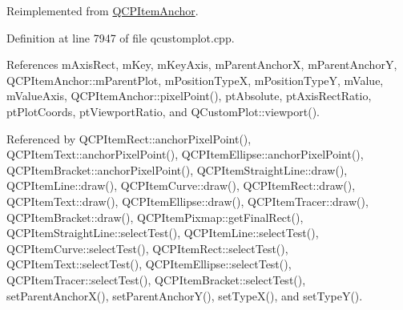Reimplemented from \hyperlink{class_q_c_p_item_anchor_ae92def8f9297c5d73f5806c586517bb3}{Q\+C\+P\+Item\+Anchor}.



Definition at line 7947 of file qcustomplot.\+cpp.



References m\+Axis\+Rect, m\+Key, m\+Key\+Axis, m\+Parent\+Anchor\+X, m\+Parent\+Anchor\+Y, Q\+C\+P\+Item\+Anchor\+::m\+Parent\+Plot, m\+Position\+Type\+X, m\+Position\+Type\+Y, m\+Value, m\+Value\+Axis, Q\+C\+P\+Item\+Anchor\+::pixel\+Point(), pt\+Absolute, pt\+Axis\+Rect\+Ratio, pt\+Plot\+Coords, pt\+Viewport\+Ratio, and Q\+Custom\+Plot\+::viewport().



Referenced by Q\+C\+P\+Item\+Rect\+::anchor\+Pixel\+Point(), Q\+C\+P\+Item\+Text\+::anchor\+Pixel\+Point(), Q\+C\+P\+Item\+Ellipse\+::anchor\+Pixel\+Point(), Q\+C\+P\+Item\+Bracket\+::anchor\+Pixel\+Point(), Q\+C\+P\+Item\+Straight\+Line\+::draw(), Q\+C\+P\+Item\+Line\+::draw(), Q\+C\+P\+Item\+Curve\+::draw(), Q\+C\+P\+Item\+Rect\+::draw(), Q\+C\+P\+Item\+Text\+::draw(), Q\+C\+P\+Item\+Ellipse\+::draw(), Q\+C\+P\+Item\+Tracer\+::draw(), Q\+C\+P\+Item\+Bracket\+::draw(), Q\+C\+P\+Item\+Pixmap\+::get\+Final\+Rect(), Q\+C\+P\+Item\+Straight\+Line\+::select\+Test(), Q\+C\+P\+Item\+Line\+::select\+Test(), Q\+C\+P\+Item\+Curve\+::select\+Test(), Q\+C\+P\+Item\+Rect\+::select\+Test(), Q\+C\+P\+Item\+Text\+::select\+Test(), Q\+C\+P\+Item\+Ellipse\+::select\+Test(), Q\+C\+P\+Item\+Tracer\+::select\+Test(), Q\+C\+P\+Item\+Bracket\+::select\+Test(), set\+Parent\+Anchor\+X(), set\+Parent\+Anchor\+Y(), set\+Type\+X(), and set\+Type\+Y().


